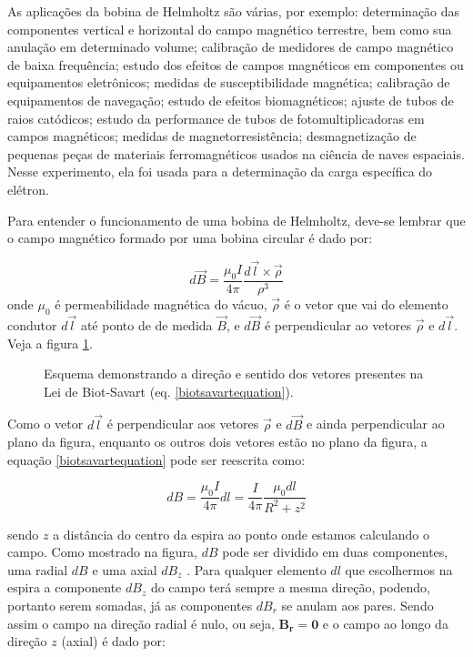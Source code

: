 \documentclass{article}
\begin{document}
As aplicações da bobina de Helmholtz são várias, por exemplo: determinação das componentes vertical e horizontal do campo magnético terrestre, bem como sua anulação em determinado volume; calibração de medidores de campo magnético de baixa frequência; estudo dos efeitos de campos magnéticos em componentes ou equipamentos eletrônicos; medidas de susceptibilidade magnética; calibração de equipamentos de navegação; estudo de efeitos biomagnéticos; ajuste de tubos de raios catódicos; estudo da performance de tubos de fotomultiplicadoras em campos magnéticos; medidas de magnetorresistência; desmagnetização de pequenas peças de materiais ferromagnéticos usados na ciência de naves espaciais. Nesse experimento, ela foi usada para a determinação da carga específica do elétron.

Para entender o funcionamento de uma bobina de Helmholtz, deve-se lembrar que o campo magnético formado por uma bobina circular é dado por:

\begin{equation}
    \label{biotsavartequation}
    d \vec B =  \frac{\mu _0 I}{4 \pi} \frac{d \vec l \times \vec \rho} {\rho ^3}
\end{equation}
onde $\mu _0$ é permeabilidade magnética do vácuo, $\vec \rho$ é o vetor que vai do elemento condutor $d \vec l$ até ponto de de medida $\vec B$, e $d \vec B$ é perpendicular ao vetores $\vec \rho$ e $d \vec l$. Veja a figura \ref{biotsvartimage}.

\begin{figure}
    \centering
    
    \caption{Esquema demonstrando a direção e sentido dos vetores presentes na Lei de Biot-Savart (eq. \ref{biotsavartequation}). }
    \label{biotsvartimage}
\end{figure}

Como o vetor $d \vec l$ é perpendicular aos vetores $\vec \rho$ e $d \vec B$ e ainda perpendicular ao plano da figura, enquanto os outros dois vetores estão no plano da figura, a equação \ref{biotsavartequation} pode ser reescrita como:

\begin{equation}
    dB = \frac{\mu _0 I}{4 \pi} dl = \frac{I}{4 \pi} \frac{\mu _0 dl}{R^2 +z^2}
\end{equation}

sendo $z$ a distância do centro da espira ao ponto onde estamos calculando o campo. Como mostrado na figura, $dB$ pode ser dividido em duas componentes, uma radial $dB$ e uma axial $dB _z$ . Para qualquer elemento $dl$ que escolhermos na espira a componente $dB _z$ do campo terá sempre a mesma direção, podendo, portanto serem somadas, já as componentes $dB _r$ se anulam aos pares. Sendo assim o campo na direção radial é nulo, ou seja, $\mathbf{B _r = 0}$ e o campo ao longo da direção $z$ (axial) é dado por:
\end{document}
